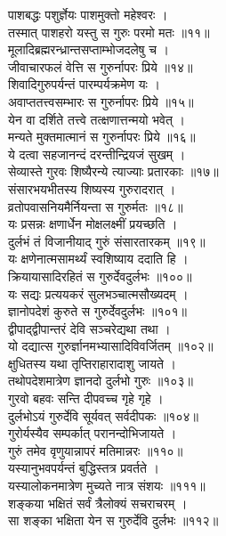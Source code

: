 पाशबद्धः पशुर्ज्ञेयः पाशमुक्तो महेश्वरः ।\\[-2mm]
तस्मात् पाशहरो यस्तु स गुरुः परमो मतः ॥११॥\\ 
मूलादिब्रह्मरन्ध्रान्तसप्ताम्भोजदलेषु च ।\\[-2mm]
जीवाचारफलं वेत्ति स गुरुर्नापरः प्रिये ॥१४॥\\
शिवादिगुरुपर्यन्तं पारम्पर्यक्रमेण यः ।\\[-2mm]
अवाप्ततत्त्वसम्भारः स गुरुर्नापरः प्रिये ॥१५॥\\
येन वा दर्शिते तत्त्वे तत्क्षणात्तन्मयो भवेत् ।\\[-2mm]
मन्यते मुक्तमात्मानं स गुरुर्नापरः प्रिये ॥१६॥\\
ये दत्वा सहजानन्दं दरन्तीन्द्रियजं सुखम् ।\\[-2mm]
सेव्यास्ते गुरवः शिष्यैरन्ये त्याज्याः प्रतारकाः ॥१७॥\\
संसारभयभीतस्य शिष्यस्य गुरुरादरात् ।\\[-2mm]
व्रतोपवासनियमैर्नियन्ता स गुरुर्मतः ॥१८॥\\
यः प्रसन्नः क्षणार्धेन मोक्षलक्ष्मीं प्रयच्छति ।\\[-2mm]
दुर्लभं तं विजानीयाद् गुरुं संसारतारकम् ॥१९॥\\
यः क्षणेनात्मसामर्थ्यं स्वशिष्याय ददाति हि ।\\[-2mm]
क्रियायासादिरहितं स गुरुर्देवदुर्लभः ॥१००॥\\
यः सद्यः प्रत्ययकरं सुलभञ्चात्मसौख्यदम् ।\\[-2mm]
ज्ञानोपदेशं कुरुते स गुरुर्देवदुर्लभः ॥१०१॥\\
द्वीपाद्द्वीपान्तरं देवि सञ्चरेद्यथा तथा ।\\[-2mm]
यो दद्यात्स गुरुर्ज्ञानमभ्यासादिविवर्जितम् ॥१०२॥\\
क्षुधितस्य यथा तृप्तिराहारादाशु जायते ।\\[-2mm]
तथोपदेशमात्रेण ज्ञानदो दुर्लभो गुरुः ॥१०३॥\\
गुरवो बहवः सन्ति दीपवच्च गृहे गृहे ।\\[-2mm]
दुर्लभोऽयं गुरुर्देवि सूर्यवत् सर्वदीपकः ॥१०४॥\\
गुरोर्यस्यैव सम्पर्कात् परानन्दोभिजायते ।\\[-2mm]
गुरुं तमेव वृणुयान्नापरं मतिमान्नरः ॥११०॥\\
यस्यानुभवपर्यन्तं बुद्धिस्तत्र प्रवर्तते ।\\[-2mm]
यस्यालोकनमात्रेण मुच्यते नात्र संशयः ॥१११॥\\
शङ्कया भक्षितं सर्वं त्रैलोक्यं सचराचरम् ।\\[-2mm]
सा शङ्का भक्षिता येन स गुरुर्देवि दुर्लभः ॥११२॥\\
